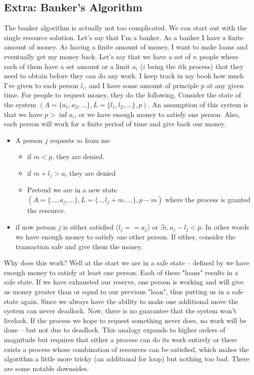 \subsection{Extra: Banker's Algorithm}

The banker algorithm is actually not too complicated.
We can start out with the single resource solution.
Let's say that I'm a banker.
As a banker I have a finite amount of money.
As having a finite amount of money, I want to make loans and eventually get my money back.
Let's say that we have a set of $n$ people where each of them have a set amount or a limit $a_i$ ($i$ being the $i$th process) that they need to obtain before they can do any work.
I keep track in my book how much I've given to each person $l_i$, and I have some amount of principle $p$ at any given time.
For people to request money, they do the following. Consider the state of the system $(A=\{a_1, a_2, ...\}, L=\{l_1, l_2, ...\}, p)$.
An assumption of this system is that we have $p > \inf a_i$, or we have enough money to satisfy one person.
Also, each person will work for a finite period of time and give back our money.

\begin{itemize}
\item A person $j$ requests $m$ from me
\begin{itemize}
\item if $m < p$, they are denied.
\item if $m + l_j > a_i$ they are denied
\item Pretend we are in a new state $(A=\{..., a_j, ...\}, L=\{.., l_j + m, ...\}, p - m)$ where the process is granted the resource.
\end{itemize}
\item if now person $j$ is either satisfied ($l_j == a_j$) or $\exists i, a_j - l_j < p$. In other words we have enough money to satisfy one other person. If either, consider the transaction safe and give them the money.
\end{itemize}

Why does this work? Well at the start we are in a safe state -- defined by we have enough money to satisfy at least one person.
Each of these "loans" results in a safe state.
If we have exhausted our reserve, one person is working and will give us money greater than or equal to our previous "loan", thus putting us in a safe state again.
Since we always have the ability to make one additional move the system can never deadlock.
Now, there is no guarantee that the system won't livelock.
If the process we hope to request something never does, no work will be done -- but not due to deadlock.
This analogy expands to higher orders of magnitude but requires that either a process can do its work entirely or there exists a process whose combination of resources can be satisfied, which makes the algorithm a little more tricky (an additional for loop) but nothing too bad.
There are some notable downsides.

